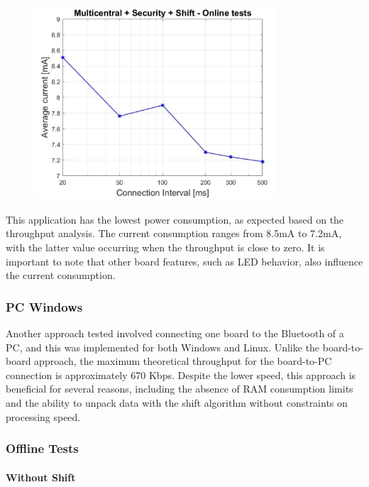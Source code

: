 \documentclass{Configuration_Files/PoliMi3i_thesis}
\begin{document}
\begin{figure}[h!]
    \centering
    \includegraphics[width=0.8\textwidth]{Results Manuel/figure32}
    \label{fig:figure1}
\end{figure}

This application has the lowest power consumption, as expected based on the throughput analysis. The current consumption ranges from 8.5mA to 7.2mA, with the latter value occurring when the throughput is close to zero. It is important to note that other board features, such as LED behavior, also influence the current consumption.

\subsubsection*{PC Windows}

Another approach tested involved connecting one board to the Bluetooth of a PC, and this was implemented for both Windows and Linux. Unlike the board-to-board approach, the maximum theoretical throughput for the board-to-PC connection is approximately 670 Kbps. Despite the lower speed, this approach is beneficial for several reasons, including the absence of RAM consumption limits and the ability to unpack data with the shift algorithm without constraints on processing speed.

\subsubsection*{Offline Tests}

\paragraph{Without Shift}
\end{document}
